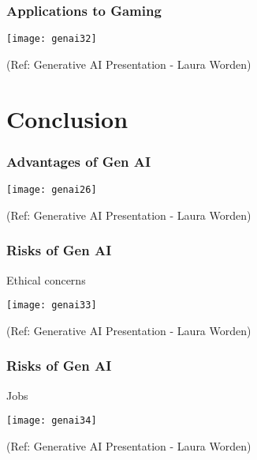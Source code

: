 \begin{frame}[fragile]\frametitle{Applications to Gaming}

\begin{center}
\texttt{[image: genai32]}
\end{center}


{\tiny (Ref: Generative AI Presentation  - Laura Worden)}

\end{frame}


\section{Conclusion}

\begin{frame}[fragile]\frametitle{Advantages of Gen AI}

\begin{center}
\texttt{[image: genai26]}
\end{center}


{\tiny (Ref: Generative AI Presentation  - Laura Worden)}

\end{frame}

\begin{frame}[fragile]\frametitle{Risks of Gen AI}
Ethical concerns

\begin{center}
\texttt{[image: genai33]}
\end{center}


{\tiny (Ref: Generative AI Presentation  - Laura Worden)}

\end{frame}

\begin{frame}[fragile]\frametitle{Risks of Gen AI}
Jobs

\begin{center}
\texttt{[image: genai34]}
\end{center}


{\tiny (Ref: Generative AI Presentation  - Laura Worden)}

\end{frame}

